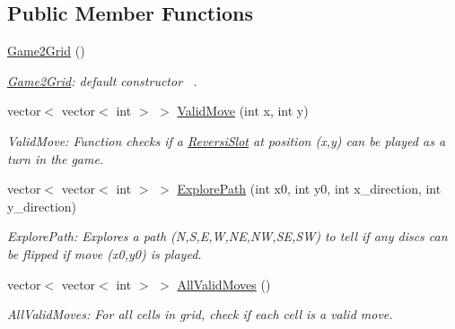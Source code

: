 \subsection*{Public Member Functions}
\begin{DoxyCompactItemize}
\item 
\hyperlink{classGame2Grid_a4bf23814b061f4674560548f922033ff}{Game2\+Grid} ()
\begin{DoxyCompactList}\small\item\em \hyperlink{classGame2Grid}{Game2\+Grid}\+: default constructor~\newline
. \end{DoxyCompactList}\item 
vector$<$ vector$<$ int $>$ $>$ \hyperlink{classGame2Grid_a3505dced106fa8df9285b65a5e02f686}{Valid\+Move} (int x, int y)
\begin{DoxyCompactList}\small\item\em Valid\+Move\+: Function checks if a \hyperlink{classReversiSlot}{Reversi\+Slot} at position (x,y) can be played as a turn in the game. \end{DoxyCompactList}\item 
vector$<$ vector$<$ int $>$ $>$ \hyperlink{classGame2Grid_a530992f6eaed3c76ad923305cd7ae86a}{Explore\+Path} (int x0, int y0, int x\+\_\+direction, int y\+\_\+direction)
\begin{DoxyCompactList}\small\item\em Explore\+Path\+: Explores a path (N,S,E,W,NE,NW,SE,SW) to tell if any discs can be flipped if move (x0,y0) is played. \end{DoxyCompactList}\item 
vector$<$ vector$<$ int $>$ $>$ \hyperlink{classGame2Grid_aab66dd4b9d00c82f692cfaa6a8642815}{All\+Valid\+Moves} ()
\begin{DoxyCompactList}\small\item\em All\+Valid\+Moves\+: For all cells in grid, check if each cell is a valid move. \end{DoxyCompactList}\end{DoxyCompactItemize}
